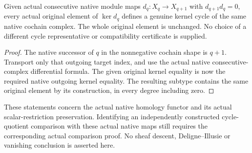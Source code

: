 \begin{theorem}
\label{lem:native-module-complex-consecutive-cycles}
\leanok
Given actual consecutive native module maps $d_q:X_q\to X_{q+1}$
with $d_{q+1}d_q=0$, every actual original element of $\ker d_q$
defines a genuine kernel cycle of the same native cochain complex.
The whole original element is unchanged. No choice of a different
cycle representative or compatibility certificate is supplied.
\end{theorem}
\begin{proof}
The native successor of $q$ in the nonnegative cochain shape is
$q+1$. Transport only that outgoing target index, and use the actual
native consecutive-complex differential formula. The given original
kernel equality is now the required native outgoing kernel equality.
The resulting subtype contains the same original element by its
construction, in every degree including zero.
\end{proof}

These statements concern the actual native homology functor and its
actual scalar-restriction preservation. Identifying an independently
constructed cycle-quotient comparison with these actual native maps
still requires the corresponding actual comparison proof. No sheaf
descent, Deligne--Illusie or vanishing conclusion is asserted here.
